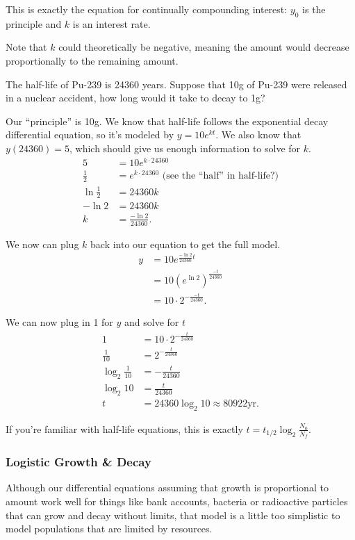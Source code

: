 This is exactly the equation for continually compounding interest: $y_0$ is the principle and $k$ is an interest rate.


Note that $k$ could theoretically be negative, meaning the amount would decrease proportionally to the remaining amount.
\begin{example}
	The half-life of Pu-239 is 24360 years.
	Suppose that 10g of Pu-239 were released in a nuclear accident, how long would it take to decay to 1g?
\end{example}
\begin{answer}
	Our ``principle'' is 10g.
	We know that half-life follows the exponential decay differential equation, so it's modeled by $y = 10e^{kt}$.
	We also know that $y(24360)=5$, which should give us enough information to solve for $k$.
	\begin{align*}
		5 &= 10e^{k\cdot 24360} \\
		\frac{1}{2} &= e^{k\cdot 24360} \text{ (see the ``half'' in half-life?)} \\
		\ln{\frac{1}{2}} &= 24360k \\
		-\ln{2} &= 24360k \\
		k &= \frac{-\ln{2}}{24360}.
	\end{align*}
	
	We now can plug $k$ back into our equation to get the full model.
	\begin{align*}
		y &= 10e^{\frac{-\ln{2}}{24360}t} \\
		&= 10\left(e^{\ln{2}}\right)^{\frac{-t}{24360}} \\
		&= 10\cdot2^{-\frac{-t}{24360}}.
	\end{align*}
	
	We can now plug in 1 for $y$ and solve for $t$
	\begin{align*}
		1 &= 10\cdot2^{-\frac{t}{24360}} \\
		\frac{1}{10} &= 2^{-\frac{t}{24360}} \\
		\log_{2}{\frac{1}{10}} &= -\frac{t}{24360} \\
		\log_{2}{10} &= \frac{t}{24360} \\
		t &= 24360\log_{2}{10} \approx 80922\text{yr}.
	\end{align*}
	
	If you're familiar with half-life equations, this is exactly $t=t_{1/2}\log_{2}{\frac{N_0}{N_f}}$.
\end{answer}

\subsubsection{Logistic Growth \& Decay}
Although our differential equations assuming that growth is proportional to amount work well for things like bank accounts, bacteria or radioactive particles that can grow and decay without limits, that model is a little too simplistic to model populations that are limited by resources.

